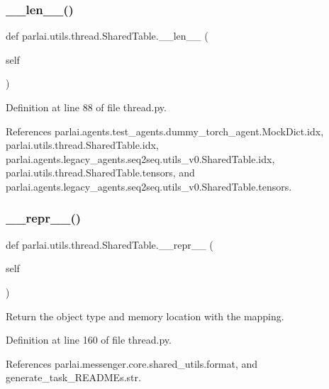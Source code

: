\subsubsection{\texorpdfstring{\+\_\+\+\_\+len\+\_\+\+\_\+()}{\_\_len\_\_()}}
{\footnotesize\ttfamily def parlai.\+utils.\+thread.\+Shared\+Table.\+\_\+\+\_\+len\+\_\+\+\_\+ (\begin{DoxyParamCaption}\item[{}]{self }\end{DoxyParamCaption})}



Definition at line 88 of file thread.\+py.



References parlai.\+agents.\+test\+\_\+agents.\+dummy\+\_\+torch\+\_\+agent.\+Mock\+Dict.\+idx, parlai.\+utils.\+thread.\+Shared\+Table.\+idx, parlai.\+agents.\+legacy\+\_\+agents.\+seq2seq.\+utils\+\_\+v0.\+Shared\+Table.\+idx, parlai.\+utils.\+thread.\+Shared\+Table.\+tensors, and parlai.\+agents.\+legacy\+\_\+agents.\+seq2seq.\+utils\+\_\+v0.\+Shared\+Table.\+tensors.

\mbox{\label{classparlai_1_1utils_1_1thread_1_1SharedTable_af4577c8c954666ac3905a6215835bbd0}} 
\subsubsection{\texorpdfstring{\+\_\+\+\_\+repr\+\_\+\+\_\+()}{\_\_repr\_\_()}}
{\footnotesize\ttfamily def parlai.\+utils.\+thread.\+Shared\+Table.\+\_\+\+\_\+repr\+\_\+\+\_\+ (\begin{DoxyParamCaption}\item[{}]{self }\end{DoxyParamCaption})}

\begin{DoxyVerb}Return the object type and memory location with the mapping.\end{DoxyVerb}
 

Definition at line 160 of file thread.\+py.



References parlai.\+messenger.\+core.\+shared\+\_\+utils.\+format, and generate\+\_\+task\+\_\+\+R\+E\+A\+D\+M\+Es.\+str.

